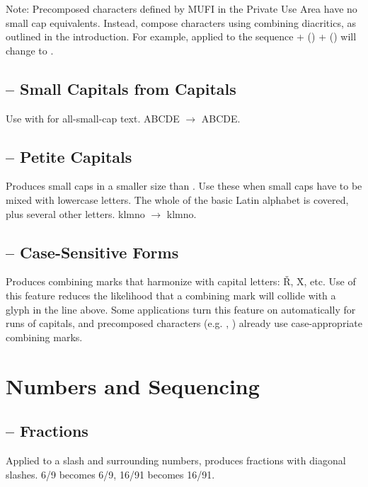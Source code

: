 Note: Precomposed characters defined by MUFI in the Private Use Area have no small cap equivalents. Instead, compose
characters using combining diacritics, as outlined in the introduction. For example,  applied
to the sequence  +  () +  () will change  to .

\subsection{ -- Small Capitals from Capitals}
Use with  for all-small-cap text. ABCDE $\rightarrow $ {ABCDE}.

\subsection{ -- Petite Capitals}
Produces small caps in a smaller size than . Use these when small caps have to be mixed with
lowercase letters. The whole of the basic Latin alphabet is covered, plus several other letters. klmno{\th}
$\rightarrow $ {klmno\th}.

\subsection{ -- Case-Sensitive Forms}
Produces combining marks that harmonize with capital letters: {\v{R}, X̉}, etc. Use of this feature reduces the
likelihood that a combining mark will collide with a glyph in the line above. Some applications turn this
feature on automatically for runs of capitals, and precomposed characters
(e.g.  ,  )
already use case-appropriate combining marks.

\section{Numbers and Sequencing}
\subsection{ -- Fractions}
Applied to a slash and surrounding numbers, produces fractions with diagonal
slashes. 6/9 becomes {6/9}, 16/91 becomes {16/91}.

